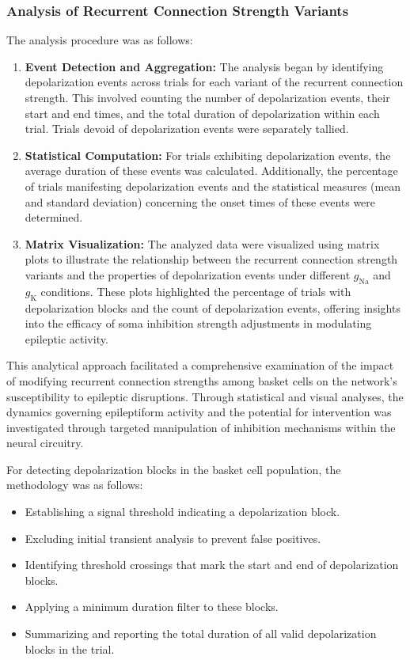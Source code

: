 \subsubsection{Analysis of Recurrent Connection Strength Variants}
\noindent The analysis procedure was as follows:
\begin{enumerate}
    \item \textbf{Event Detection and Aggregation:} The analysis began by identifying depolarization events across trials for each variant of the recurrent connection strength. This involved counting the number of depolarization events, their start and end times, and the total duration of depolarization within each trial. Trials devoid of depolarization events were separately tallied.

    \item \textbf{Statistical Computation:} For trials exhibiting depolarization events, the average duration of these events was calculated. Additionally, the percentage of trials manifesting depolarization events and the statistical measures (mean and standard deviation) concerning the onset times of these events were determined.

    \item \textbf{Matrix Visualization:} The analyzed data were visualized using matrix plots to illustrate the relationship between the recurrent connection strength variants and the properties of depolarization events under different \(g_{\text{Na}}\) and \(g_{\text{K}}\) conditions. These plots highlighted the percentage of trials with depolarization blocks and the count of depolarization events, offering insights into the efficacy of soma inhibition strength adjustments in modulating epileptic activity.
\end{enumerate}

\noindent
This analytical approach facilitated a comprehensive examination of the impact of modifying recurrent connection strengths among basket cells on the network's susceptibility to epileptic disruptions.
Through statistical and visual analyses, the dynamics governing epileptiform activity and the potential for intervention was investigated through targeted manipulation of inhibition mechanisms within the neural circuitry.

\noindent For detecting depolarization blocks in the basket cell population, the
methodology was as follows:
\begin{itemize}
    \item Establishing a signal threshold indicating a depolarization block.
    \item Excluding initial transient analysis to prevent false positives.
    \item Identifying threshold crossings that mark the start and end of depolarization
          blocks.
    \item Applying a minimum duration filter to these blocks.
    \item Summarizing and reporting the total duration of all valid depolarization blocks
          in the trial.
\end{itemize}


